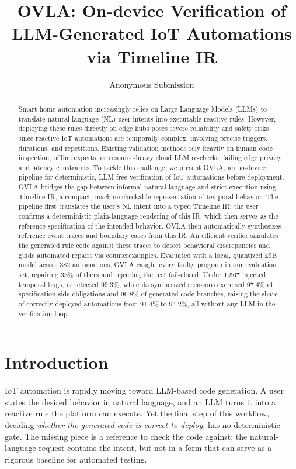 \documentclass[sigconf,nonacm,anonymous,review]{acmart}
\title{OVLA: On-device Verification of LLM-Generated IoT Automations via Timeline IR}
\author{Anonymous Submission}
\affiliation{\institution{Submitted to SenSys 2027}\country{}}
\begin{document}
\begin{abstract}
Smart home automation increasingly relies on Large Language Models (LLMs) to translate natural language (NL) user intents into executable reactive rules. However, deploying these rules directly on edge hubs poses severe reliability and safety risks since reactive IoT automations are temporally complex, involving precise triggers, durations, and repetitions. Existing validation methods rely heavily on human code inspection, offline experts, or resource-heavy cloud LLM re-checks, failing edge privacy and latency constraints. To tackle this challenge, we present OVLA, an on-device pipeline for deterministic, LLM-free verification of IoT automations before deployment. OVLA bridges the gap between informal natural language and strict execution using Timeline IR, a compact, machine-checkable representation of temporal behavior. The pipeline first translates the user's NL intent into a typed Timeline IR; the user confirms a deterministic plain-language rendering of this IR, which then serves as the reference specification of the intended behavior. OVLA then automatically synthesizes reference event traces and boundary cases from this IR. An efficient verifier simulates the generated rule code against these traces to detect behavioral discrepancies and guide automated repairs via counterexamples. Evaluated with a local, quantized ≤9B model across 382 automations, OVLA caught every faulty program in our evaluation set, repairing 33\% of them and rejecting the rest fail-closed. Under 1,567 injected temporal bugs, it detected 99.3\%, while its synthesized scenarios exercised 97.4\% of specification-side obligations and 96.8\% of generated-code branches, raising the share of correctly deployed automations from 91.4\% to 94.2\%, all without any LLM in the verification loop.
\end{abstract}


\maketitle

\section{Introduction}

IoT automation is rapidly moving toward LLM-based code generation. A user states the desired behavior in natural language, and an LLM turns it into a reactive rule the platform can execute. Yet the final step of this workflow, deciding \emph{whether the generated code is correct to deploy}, has no deterministic gate. The missing piece is a reference to check the code against; the natural-language request contains the intent, but not in a form that can serve as a rigorous baseline for automated testing.
\end{document}
